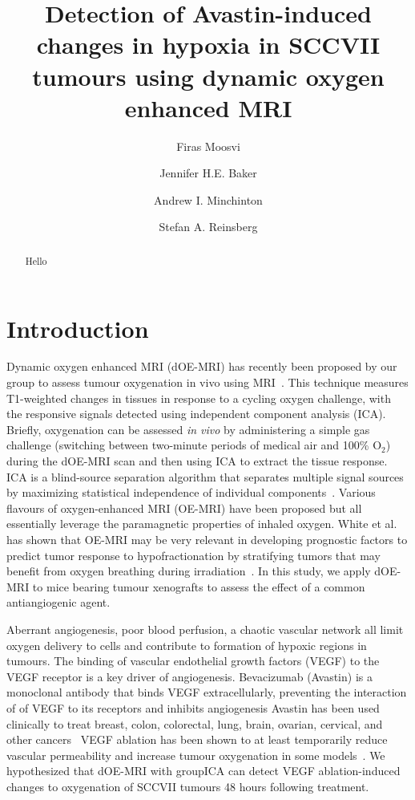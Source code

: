 \documentclass[num-refs]{wiley-article}
\title{Detection of Avastin-induced changes in hypoxia in SCCVII tumours using dynamic oxygen enhanced MRI}
\author[1]{Firas Moosvi}
\author[2]{Jennifer H.E. Baker}
\author[2]{Andrew I. Minchinton}
\author[1\authfn{1}]{Stefan A. Reinsberg}
\affil[1]{Department of Physics \& Astronomy, University of British Columbia, Vancouver, Canada}
\affil[2]{Radiation Biology Unit, British Columbia Cancer Research Centre, Vancouver, Canada}
\affil[3]{MRI Research Centre, University of British Columbia, Vancouver, Canada}
\begin{document}
\maketitle

\begin{abstract}
Hello
\keywords{}
\end{abstract}
\section{Introduction}

Dynamic oxygen enhanced MRI (dOE-MRI) has recently been proposed by our group to assess tumour oxygenation in vivo using MRI~\cite{Moosvi:2018ca}. 
This technique measures T1-weighted changes in tissues in response to a cycling oxygen challenge, with the responsive signals detected using independent component analysis (ICA). 
Briefly, oxygenation can be assessed \emph{in vivo} by administering a simple gas challenge (switching between two-minute periods of medical air and 100\% O$_2$) during the dOE-MRI scan and then using ICA to extract the tissue response.
ICA is a blind-source separation algorithm that separates multiple signal sources by maximizing statistical independence of individual components~\cite{Hyvarinen:2000vk}.
Various flavours of oxygen-enhanced MRI (OE-MRI) have been proposed but all essentially leverage the paramagnetic properties of inhaled oxygen.
White et al. has shown that OE-MRI may be very relevant in developing prognostic factors to predict tumor response to hypofractionation by stratifying tumors that may benefit from oxygen breathing during irradiation~\cite{White:2016fz}.
In this study, we apply dOE-MRI to mice bearing tumour xenografts to assess the effect of a common antiangiogenic agent.

Aberrant angiogenesis, poor blood perfusion, a chaotic vascular network all limit oxygen delivery to cells and contribute to formation of hypoxic regions in tumours.
The binding of vascular endothelial growth factors (VEGF) to the VEGF receptor is a key driver of angiogenesis.
Bevacizumab (Avastin) is a monoclonal antibody that binds VEGF extracellularly, preventing the interaction of of VEGF to its receptors and inhibits angiogenesis 
Avastin has been used clinically to treat breast, colon, colorectal, lung, brain, ovarian, cervical, and other cancers~\cite{AvastinIndications}%
VEGF ablation has been shown to at least temporarily reduce vascular permeability and increase tumour oxygenation in some models~\cite{OConnor:2012iea}. 
We hypothesized that dOE-MRI with groupICA can detect VEGF ablation-induced changes to oxygenation of SCCVII tumours 48 hours following treatment.
\end{document}
